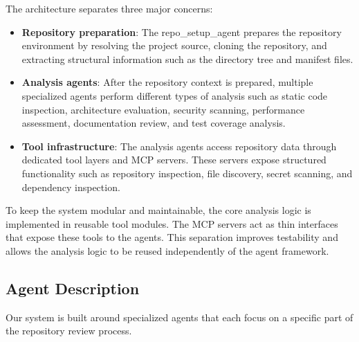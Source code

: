\documentclass[conference]{IEEEtran}
\begin{document}
The architecture separates three major concerns:

\begin{itemize}
	\item \textbf{Repository preparation}: The repo\_setup\_agent prepares the repository environment by resolving the project source, cloning the repository, and extracting structural information such as the directory tree and manifest files.
	
	\item \textbf{Analysis agents}: After the repository context is prepared, multiple specialized agents perform different types of analysis such as static code inspection, architecture evaluation, security scanning, performance assessment, documentation review, and test coverage analysis.
	
	\item \textbf{Tool infrastructure}: The analysis agents access repository data through dedicated tool layers and MCP servers. These servers expose structured functionality such as repository inspection, file discovery, secret scanning, and dependency inspection.
\end{itemize}

To keep the system modular and maintainable, the core analysis logic is implemented in reusable tool modules. The MCP servers act as thin interfaces that expose these tools to the agents. This separation improves testability and allows the analysis logic to be reused independently of the agent framework.

\subsection{Agent Description}
Our system is built around specialized agents that each focus on a specific part of the repository review process.
\end{document}
